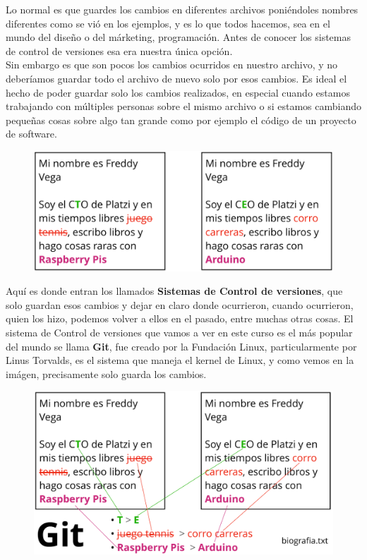 \documentclass{article}
\begin{document}
Lo normal es que guardes los cambios en diferentes archivos poniéndoles nombres
diferentes como se vió en los ejemplos, y es lo que todos hacemos, sea en el
mundo del diseño o del márketing, programación. Antes de conocer los sistemas
de control de versiones esa era nuestra única opción.\\

Sin embargo es que son pocos los cambios ocurridos en nuestro archivo, y no
deberíamos guardar todo el archivo de nuevo solo por esos cambios. Es ideal el
hecho de poder guardar solo los cambios realizados, en especial cuando estamos
trabajando con múltiples personas sobre el mismo archivo o si estamos cambiando
pequeñas cosas sobre algo tan grande como por ejemplo el código de un proyecto
de software.

\begin{figure}[h!]
  \centering
  \includegraphics[scale=0.5]{./Pictures/002_solo_cambios.png}
\end{figure}

Aquí es donde entran los llamados \textbf{Sistemas de Control de
versiones}, que solo guardan esos cambios y dejar en claro donde ocurrieron,
cuando ocurrieron, quien los hizo, podemos volver a ellos en el pasado, entre
muchas otras cosas. El sistema de Control de versiones que vamos a ver en este
curso es el más popular del mundo se llama \textbf{Git}, fue creado por la
Fundación Linux, particularmente por Linus Torvalds, es el sistema que maneja
el kernel de Linux, y como vemos en la imágen, precisamente solo guarda los
cambios.

\begin{figure}[h!]
  \centering
  \includegraphics[scale=0.5]{./Pictures/003_git.png}
\end{figure}
\end{document}
